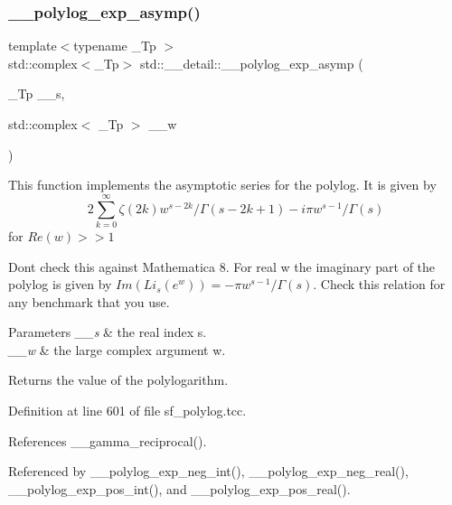 \mbox{\label{namespacestd_1_1____detail_af3684fc449da490e9a43985245618a90}} 
\subsubsection{\texorpdfstring{\+\_\+\+\_\+polylog\+\_\+exp\+\_\+asymp()}{\_\_polylog\_exp\_asymp()}}
{\footnotesize\ttfamily template$<$typename \+\_\+\+Tp $>$ \\
std\+::complex$<$\+\_\+\+Tp$>$ std\+::\+\_\+\+\_\+detail\+::\+\_\+\+\_\+polylog\+\_\+exp\+\_\+asymp (\begin{DoxyParamCaption}\item[{\+\_\+\+Tp}]{\+\_\+\+\_\+s,  }\item[{std\+::complex$<$ \+\_\+\+Tp $>$}]{\+\_\+\+\_\+w }\end{DoxyParamCaption})}

This function implements the asymptotic series for the polylog. It is given by \[ 2 \sum_{k=0}^{\infty} \zeta(2k) w^{s-2k}/\Gamma(s-2k+1) -i \pi w^{s-1}/\Gamma(s) \] for $ Re(w) >> 1 $

Don\textquotesingle{}t check this against Mathematica 8. For real w the imaginary part of the polylog is given by $ Im(Li_s(e^w)) = -\pi w^{s-1}/\Gamma(s) $. Check this relation for any benchmark that you use.


\begin{DoxyParams}{Parameters}
{\em \+\_\+\+\_\+s} & the real index s. \\
\hline
{\em \+\_\+\+\_\+w} & the large complex argument w. \\
\hline
\end{DoxyParams}
\begin{DoxyReturn}{Returns}
the value of the polylogarithm. 
\end{DoxyReturn}


Definition at line 601 of file sf\+\_\+polylog.\+tcc.



References \+\_\+\+\_\+gamma\+\_\+reciprocal().



Referenced by \+\_\+\+\_\+polylog\+\_\+exp\+\_\+neg\+\_\+int(), \+\_\+\+\_\+polylog\+\_\+exp\+\_\+neg\+\_\+real(), \+\_\+\+\_\+polylog\+\_\+exp\+\_\+pos\+\_\+int(), and \+\_\+\+\_\+polylog\+\_\+exp\+\_\+pos\+\_\+real().

